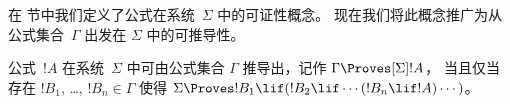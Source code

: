 \documentclass[../../../include/open-logic-section]{subfiles}
\begin{document}


在  节中我们定义了公式在系统~$\Sigma$ 中的可证性概念。
现在我们将此概念推广为从公式集合~$\Gamma$ 出发在 $\Sigma$ 中的可推导性。

\begin{defn}
  公式~$!A$ 在系统~$\Sigma$ 中可由公式集合 $\Gamma$ 推导出，记作 $\Gamma \Proves[\Sigma] !A$，
  当且仅当存在 $!B_1$, \dots, $!B_n \in \Gamma$ 使得
  $\Sigma \Proves !B_1 \lif (!B_2 \lif \cdots (!B_n \lif !A)
  \cdots)$。
\end{defn}
\end{document}

